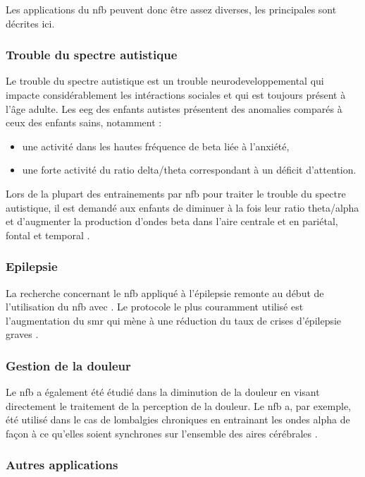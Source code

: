 Les applications du \gls{nfb} peuvent donc être assez diverses, les principales sont décrites ici. 

\subsubsection{Trouble du spectre autistique}

Le trouble du spectre autistique est un trouble neurodeveloppemental qui impacte considérablement les intéractions sociales et qui est toujours présent à 
l'âge adulte. Les \gls{eeg} des enfants autistes présentent des anomalies comparés à ceux des enfants sains, notamment \citep{Coben2010, Kouijzer2010} :
\begin{itemize}
\item une activité dans les hautes fréquence de beta liée à l'anxiété,
\item une forte activité du ratio delta/theta correspondant à un déficit d'attention.
\end{itemize}
Lors de la plupart des entrainements par \gls{nfb} pour traiter le trouble du spectre autistique, il est demandé aux enfants de diminuer à la fois leur ratio 
theta/alpha et d'augmenter la production d'ondes beta dans l'aire centrale \citep{Thompson2010} et en pariétal, fontal et temporal \citep{Othmer2007}. 

\subsubsection{Epilepsie}

La recherche concernant le \gls{nfb} appliqué à l'épilepsie remonte au début de l'utilisation du \gls{nfb} avec \citet{Lubar1976}. Le protocole le plus
couramment utilisé est l'augmentation du \gls{smr} qui mène à une réduction du taux de crises d'épilepsie graves \citep{Hughes2008, Walker2010}.

\subsubsection{Gestion de la douleur}

Le \gls{nfb} a également été étudié dans la diminution de la douleur en visant directement le traitement de la perception de la douleur. Le \gls{nfb} a, par
exemple, été utilisé dans le cas de lombalgies chroniques en entrainant les ondes alpha de façon à ce qu'elles soient synchrones sur l'ensemble des aires 
cérébrales \citep{Mayaud2019}.

\subsubsection{Autres applications}

